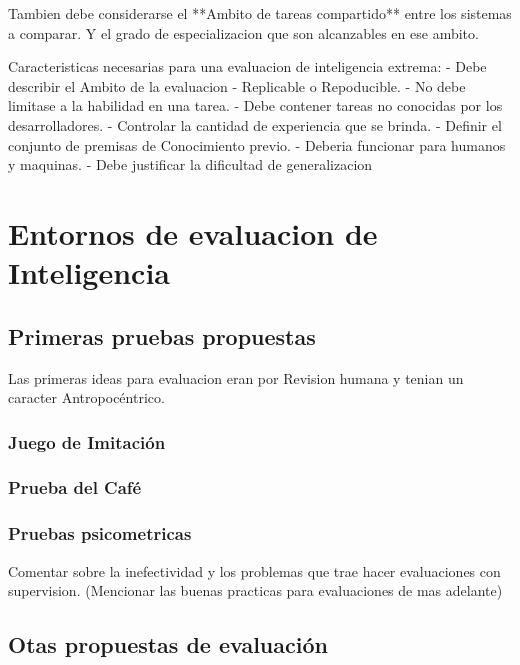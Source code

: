 Tambien debe considerarse el **Ambito de tareas compartido** entre los sistemas a comparar. Y el grado de especializacion que son alcanzables en ese ambito.

Caracteristicas necesarias para una evaluacion de inteligencia extrema:
- Debe describir el Ambito de la evaluacion
- Replicable o Repoducible.
- No debe limitase a la habilidad en una tarea.
- Debe contener tareas no conocidas por los desarrolladores.
- Controlar la cantidad de experiencia que se brinda.
- Definir el conjunto de premisas de Conocimiento previo.
- Deberia funcionar para humanos y maquinas.
- Debe justificar la dificultad de generalizacion

\section{Entornos de evaluacion de Inteligencia}\label{section:state-of-the-art:inteligence-evaluation-enviroments}

\subsection{Primeras pruebas propuestas}

Las primeras ideas para evaluacion eran por Revision humana y tenian un caracter Antropocéntrico.

\subsubsection{Juego de Imitación}

\subsubsection{Prueba del Café}

\subsubsection{Pruebas psicometricas}

Comentar sobre la inefectividad y los problemas que trae hacer evaluaciones con supervision. (Mencionar las buenas practicas para evaluaciones de mas adelante)

\subsection{Otas propuestas de evaluación}

